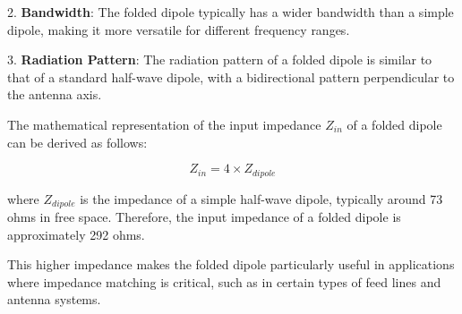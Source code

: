 2. \textbf{Bandwidth}: The folded dipole typically has a wider bandwidth than a simple dipole, making it more versatile for different frequency ranges.

3. \textbf{Radiation Pattern}: The radiation pattern of a folded dipole is similar to that of a standard half-wave dipole, with a bidirectional pattern perpendicular to the antenna axis.

The mathematical representation of the input impedance \( Z_{in} \) of a folded dipole can be derived as follows:

\[
Z_{in} = 4 \times Z_{dipole}
\]

where \( Z_{dipole} \) is the impedance of a simple half-wave dipole, typically around 73 ohms in free space. Therefore, the input impedance of a folded dipole is approximately 292 ohms.

This higher impedance makes the folded dipole particularly useful in applications where impedance matching is critical, such as in certain types of feed lines and antenna systems.


